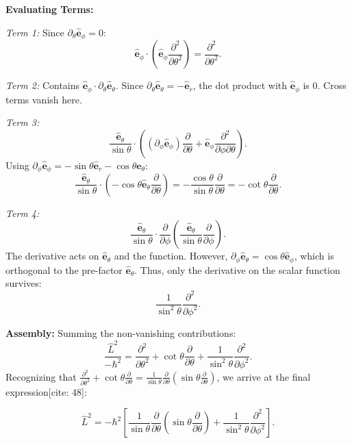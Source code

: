 \textbf{Evaluating Terms:}

\textit{Term 1:} Since $\partial_\theta \hat{\mathbf{e}}_\phi = 0$:
\[ \hat{\mathbf{e}}_\phi \cdot \left( \hat{\mathbf{e}}_\phi \frac{\partial^2}{\partial \theta^2} \right) = \frac{\partial^2}{\partial \theta^2}. \]

\textit{Term 2:} Contains $\hat{\mathbf{e}}_\phi \cdot \partial_\theta \hat{\mathbf{e}}_\theta$. Since $\partial_\theta \hat{\mathbf{e}}_\theta = -\hat{\mathbf{e}}_r$, the dot product with $\hat{\mathbf{e}}_\phi$ is 0. Cross terms vanish here.

\textit{Term 3:}
\[ \frac{\hat{\mathbf{e}}_\theta}{\sin\theta} \cdot \left( (\partial_\phi \hat{\mathbf{e}}_\phi) \frac{\partial}{\partial \theta} + \hat{\mathbf{e}}_\phi \frac{\partial^2}{\partial \phi \partial \theta} \right). \]
Using $\partial_\phi \hat{\mathbf{e}}_\phi = -\sin\theta \hat{\mathbf{e}}_r - \cos\theta \hat{\mathbf{e}}_\theta$:
\[ \frac{\hat{\mathbf{e}}_\theta}{\sin\theta} \cdot \left( -\cos\theta \hat{\mathbf{e}}_\theta \frac{\partial}{\partial \theta} \right) = -\frac{\cos\theta}{\sin\theta} \frac{\partial}{\partial \theta} = -\cot\theta \frac{\partial}{\partial \theta}. \]

\textit{Term 4:}
\[ \frac{\hat{\mathbf{e}}_\theta}{\sin\theta} \cdot \frac{\partial}{\partial \phi} \left( \frac{\hat{\mathbf{e}}_\theta}{\sin\theta} \frac{\partial}{\partial \phi} \right). \]
The derivative acts on $\hat{\mathbf{e}}_\theta$ and the function. However, $\partial_\phi \hat{\mathbf{e}}_\theta = \cos\theta \hat{\mathbf{e}}_\phi$, which is orthogonal to the pre-factor $\hat{\mathbf{e}}_\theta$. Thus, only the derivative on the scalar function survives:
\[ \frac{1}{\sin^2\theta} \frac{\partial^2}{\partial \phi^2}. \]

\textbf{Assembly:}
Summing the non-vanishing contributions:
\begin{equation}
    \frac{\hat{L}^2}{-\hbar^2} = \frac{\partial^2}{\partial \theta^2} + \cot\theta \frac{\partial}{\partial \theta} + \frac{1}{\sin^2\theta}\frac{\partial^2}{\partial \phi^2}.
\end{equation}
Recognizing that $\frac{\partial^2}{\partial \theta^2} + \cot\theta \frac{\partial}{\partial \theta} = \frac{1}{\sin\theta}\frac{\partial}{\partial \theta}\left(\sin\theta \frac{\partial}{\partial \theta}\right)$, we arrive at the final expression[cite: 48]:

\begin{equation}
    \hat{L}^2 = -\hbar^2 \left[ \frac{1}{\sin\theta}\frac{\partial}{\partial \theta}\left(\sin\theta \frac{\partial}{\partial \theta}\right) + \frac{1}{\sin^2\theta}\frac{\partial^2}{\partial \phi^2} \right].
\end{equation}